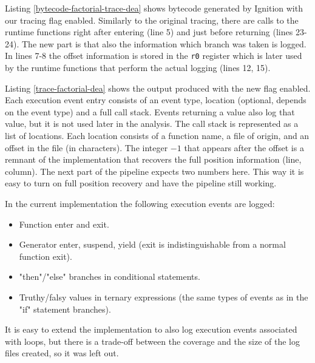 Listing \ref{bytecode-factorial-trace-dea} shows bytecode generated by Ignition with
our tracing flag enabled. Similarly to the original tracing, there are calls to the runtime functions
right after entering (line 5) and just before returning (lines 23-24). 
The new part is that also the information which branch was taken is logged.
In lines 7-8 the offset information is stored in the \texttt{r0} register which is later used by the runtime
functions that perform the actual logging (lines 12, 15).


		
Listing \ref{trace-factorial-dea} shows the output produced with the new flag enabled. Each execution event
entry consists of an event type, location (optional, depends on the event type) and a full call stack.
Events returning a value also log that value, but it is not used later in the analysis.
The call stack is represented as a list of locations. Each location consists
of a function name, a file of origin, and an offset in the file (in characters). The integer $-1$ that appears after
the offset is a remnant of the implementation that recovers the full position information (line, column).
The next part of the pipeline expects two numbers here. This way it is easy to turn on full position recovery
and have the pipeline still working.

In the current implementation the following execution events are logged:
\begin{itemize}
  \item Function enter and exit.
  \item Generator enter, suspend, yield (exit is indistinguishable from a normal function exit).
  \item "then"/"else" branches in conditional statements.
  \item Truthy/falsy values in ternary expressions (the same types of events as in the "if" statement branches).
\end{itemize}

It is easy to extend the implementation to also log execution events associated with loops, but there
is a trade-off between the coverage and the size of the log files created, so it was left out.
	


